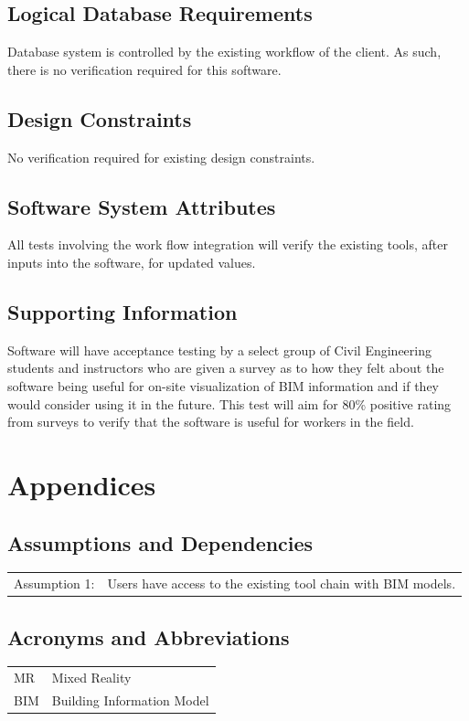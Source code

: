 \documentclass[onecolumn, draftclsnofoot,10pt, compsoc]{IEEEtran}
\begin{document}
    \subsection{Logical Database Requirements}
    Database system is controlled by the existing workflow of the client. As such, there is no verification required for this software.
    \subsection{Design Constraints}
    No verification required for existing design constraints.
    \subsection{Software System Attributes}
    All tests involving the work flow integration will verify the existing tools, after inputs into the software, for updated values.
    \subsection{Supporting Information}
    Software will have acceptance testing by a select group of Civil Engineering students and instructors who are given a survey as to how they felt about the software being useful for on-site visualization of BIM information and if they would consider using it in the future. This test will aim for 80\% positive rating from surveys to verify that the software is useful for workers in the field.\par

\pagebreak
\section{Appendices}
\subsection{Assumptions and Dependencies}
    \begin{table}[ht]
        \begin{tabular}{l p{100mm}}
           Assumption 1: & Users have access to the existing tool chain with BIM models.
        \end{tabular}
    \end{table}
\subsection{Acronyms and Abbreviations}
    \begin{table}[ht]
        \begin{tabular}{l p{100mm}}
           MR & Mixed Reality\\
           BIM & Building Information Model
        \end{tabular}
    \end{table}
\end{document}
